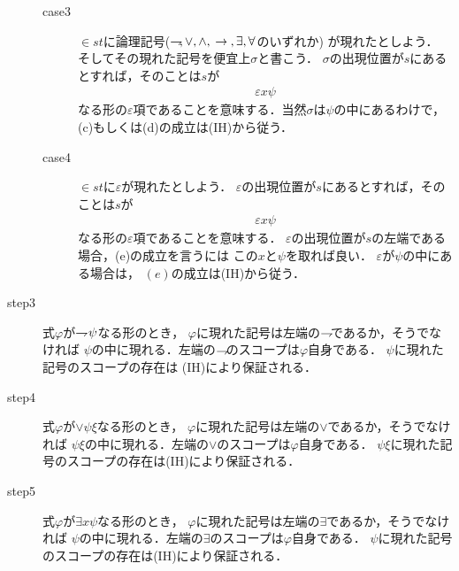 \begin{metaprf}
\begin{description}
\begin{description}
					\item[case3]
						$\in s t$に論理記号($\rightharpoondown\hspace{-0.25em},\vee,\wedge,\hspace{0.25em}\rightarrow\hspace{0.25em},\exists,\forall$のいずれか)
						が現れたとしよう．
						そしてその現れた記号を便宜上$\sigma$と書こう．
						$\sigma$の出現位置が$s$にあるとすれば，そのことは$s$が
						\begin{align}
							\varepsilon x \psi
						\end{align}
						なる形の$\varepsilon$項であることを意味する．当然$\sigma$は$\psi$の中にあるわけで，
						(c)もしくは(d)の成立は(IH)から従う．
						
					\item[case4]
						$\in s t$に$\varepsilon$が現れたとしよう．
						$\varepsilon$の出現位置が$s$にあるとすれば，そのことは$s$が
						\begin{align}
							\varepsilon x \psi
						\end{align}
						なる形の$\varepsilon$項であることを意味する．
						$\varepsilon$の出現位置が$s$の左端である場合，(e)の成立を言うには
						この$x$と$\psi$を取れば良い．
						$\varepsilon$が$\psi$の中にある場合は，
						$(e)$の成立は(IH)から従う．
				\end{description}
				
			\item[step3]
				式$\varphi$が$\rightharpoondown\hspace{-0.25em} \psi$なる形のとき，
				$\varphi$に現れた記号は左端の$\rightharpoondown\hspace{-0.25em}$であるか，そうでなければ
				$\psi$の中に現れる．左端の$\rightharpoondown\hspace{-0.25em}$のスコープは$\varphi$自身である．
				$\psi$に現れた記号のスコープの存在は
				(IH)により保証される．
				
			\item[step4]
				式$\varphi$が$\vee \psi \xi$なる形のとき，
				$\varphi$に現れた記号は左端の$\vee$であるか，そうでなければ
				$\psi \xi$の中に現れる．左端の$\vee$のスコープは$\varphi$自身である．
				$\psi \xi$に現れた記号のスコープの存在は(IH)により保証される．
			
			\item[step5]
				式$\varphi$が$\exists x \psi$なる形のとき，
				$\varphi$に現れた記号は左端の$\exists$であるか，そうでなければ
				$\psi$の中に現れる．左端の$\exists$のスコープは$\varphi$自身である．
				$\psi$に現れた記号のスコープの存在は(IH)により保証される．
				\QED
		\end{description}
	\end{metaprf}